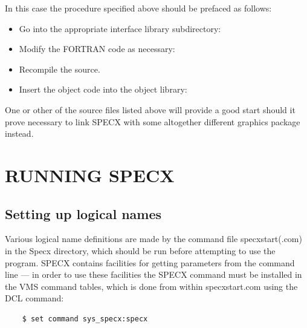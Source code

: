 \documentclass[11pt,twoside]{report}
\begin{document}
In this case the procedure specified above should be prefaced as follows:
\begin{itemize}
\item Go into the appropriate interface library subdirectory:
\item Modify the FORTRAN code as necessary:
\item Recompile the source.
\item Insert the object code into the object library:
\end{itemize}

One or other of the source files listed above will provide a good
start should it prove necessary to link SPECX with some altogether
different graphics package instead.

\section{RUNNING SPECX}

\subsection{Setting up logical names}

Various logical name definitions are made by the command file
specxstart(.com) in the Specx directory, which
should be run before attempting to use the program. SPECX contains
facilities for getting parameters from the command line --- in order
to use these facilities the SPECX command must be installed in the VMS
command tables, which is done from within
specxstart.com using the DCL command:
\begin{verbatim}
    $ set command sys_specx:specx
\end{verbatim}
\end{document}
